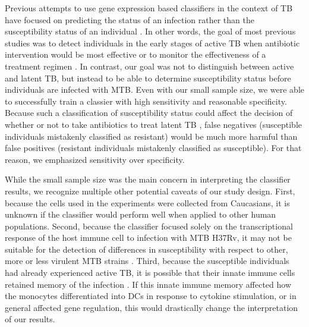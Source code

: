 \documentclass[fleqn,10pt]{wlscirep}
\begin{document}
Previous attempts to use gene expression based classifiers in the
context of TB have focused on predicting the status of an infection
rather than the susceptibility status of an individual
\cite{Berry2010, OGarra2013, Blankley2014}. In other words, the goal
of most previous studies was to detect individuals in the early stages
of active TB when antibiotic intervention would be most effective or
to monitor the effectiveness of a treatment regimen
\cite{Maertzdorf2015}. In contrast, our goal was not to distinguish
between active and latent TB, but instead to be able to determine
susceptibility status before individuals are infected with MTB. Even
with our small sample size, we were able to successfully train a
classier with high sensitivity and reasonable specificity. Because
such a classification of susceptibility status could affect the
decision of whether or not to take antibiotics to treat latent TB
\cite{Munoz2015}, false negatives (susceptible individuals mistakenly
classified as resistant) would be much more harmful than false
positives (resistant individuals mistakenly classified as
susceptible). For that reason, we emphasized sensitivity over
specificity.

While the small sample size was the main concern in interpreting the
classifier results, we recognize multiple other potential caveats of
our study design. First, because the cells used in the experiments
were collected from Caucasians, it is unknown if the classifier would
perform well when applied to other human populations. Second, because
the classifier focused solely on the transcriptional response of the
host immune cell to infection with MTB H37Rv, it may not be suitable
for the detection of differences in susceptibility with respect to
other, more or less virulent MTB strains \cite{Coscolla2010}. Third,
because the susceptible individuals had already experienced active TB,
it is possible that their innate immune cells retained memory of the
infection \cite{Ostuni2013, Netea2016}. If this innate immune memory
affected how the monocytes differentiated into DCs in response to
cytokine stimulation, or in general affected gene regulation, this
would drastically change the interpretation of our results.
\end{document}
